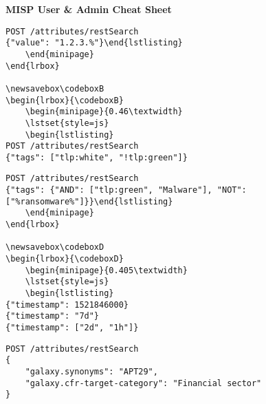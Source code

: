 \begin{center}{
    \huge{\textbf{MISP User \& Admin Cheat Sheet}}}\\
\end{center}

\newsavebox\codeboxA
\begin{lrbox}{\codeboxA}
    \begin{minipage}{0.46\textwidth}
    \lstset{style=js}
    \begin{lstlisting}
POST /attributes/restSearch
{"value": "1.2.3.%"}\end{lstlisting}
    \end{minipage}
\end{lrbox}

\newsavebox\codeboxB
\begin{lrbox}{\codeboxB}
    \begin{minipage}{0.46\textwidth}
    \lstset{style=js}
    \begin{lstlisting}
POST /attributes/restSearch
{"tags": ["tlp:white", "!tlp:green"]}\end{lstlisting}
    \end{minipage}
\end{lrbox}

\newsavebox\codeboxC
\begin{lrbox}{\codeboxC}
    \begin{minipage}{0.46\textwidth}
    \lstset{style=js}
    \begin{lstlisting}
POST /attributes/restSearch
{"tags": {"AND": ["tlp:green", "Malware"], "NOT": ["%ransomware%"]}}\end{lstlisting}
    \end{minipage}
\end{lrbox}

\newsavebox\codeboxD
\begin{lrbox}{\codeboxD}
    \begin{minipage}{0.405\textwidth}
    \lstset{style=js}
    \begin{lstlisting}
{"timestamp": 1521846000}
{"timestamp": "7d"}
{"timestamp": ["2d", "1h"]}\end{lstlisting}
    \end{minipage}
\end{lrbox}

\newsavebox\codeboxE
\begin{lrbox}{\codeboxE}
    \begin{minipage}{0.46\textwidth}
    \lstset{style=js}
    \begin{lstlisting}
POST /attributes/restSearch
{
    "galaxy.synonyms": "APT29",
    "galaxy.cfr-target-category": "Financial sector"
}\end{lstlisting}
    \end{minipage}
\end{lrbox}

